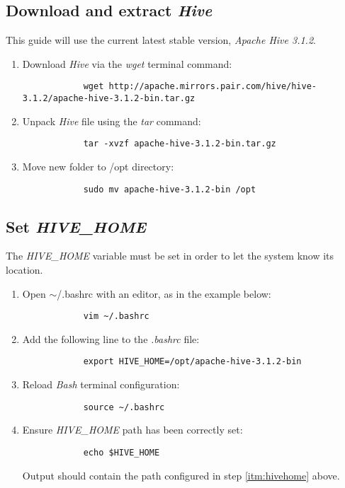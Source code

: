 \documentclass{article}
\begin{document}
    \subsection{Download and extract \emph{Hive}}
    This guide will use the current latest stable version, \emph{Apache Hive 3.1.2}.
    \begin{enumerate}
        \item Download \emph{Hive} via the \emph{wget} terminal command:
        \begin{verbatim}
            wget http://apache.mirrors.pair.com/hive/hive-3.1.2/apache-hive-3.1.2-bin.tar.gz
        \end{verbatim}

        \item Unpack \emph{Hive} file using the \emph{tar} command:
        \begin{verbatim}
            tar -xvzf apache-hive-3.1.2-bin.tar.gz
        \end{verbatim}

        \item Move new folder to /opt directory:
        \begin{verbatim}
            sudo mv apache-hive-3.1.2-bin /opt
        \end{verbatim}
    \end{enumerate}

    \subsection{Set \emph{HIVE\_HOME}}
    The \emph{HIVE\_HOME} variable must be set in order to let the system know its location.
    \begin{enumerate}
        \item Open $\sim$/.bashrc with an editor, as in the example below:
        \begin{verbatim}
            vim ~/.bashrc
        \end{verbatim}

        \item Add the following line to the \emph{.bashrc} file:
        \label{itm:hivehome}
        \begin{verbatim}
            export HIVE_HOME=/opt/apache-hive-3.1.2-bin
        \end{verbatim}

        \item Reload \emph{Bash} terminal configuration:
        \begin{verbatim}
            source ~/.bashrc
        \end{verbatim}
        
        \item Ensure \emph{HIVE\_HOME} path has been correctly set:
        \begin{verbatim}
            echo $HIVE_HOME
        \end{verbatim}
        Output should contain the path configured in step \ref{itm:hivehome} above.
    \end{enumerate}
\end{document}
